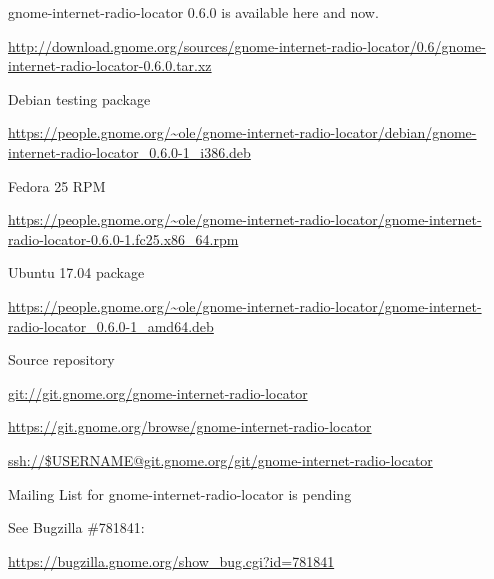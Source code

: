 \documentclass[20pt,landscape]{foils}
\begin{document}
\begin{list1}
\item gnome-internet-radio-locator 0.6.0 is available here and now.
  \begin{list2}
  \item \begin{tiny}\url{http://download.gnome.org/sources/gnome-internet-radio-locator/0.6/gnome-internet-radio-locator-0.6.0.tar.xz}\end{tiny}
  \end{list2}
\item Debian testing package
  \begin{list2}
  \item \begin{tiny}\url{https://people.gnome.org/~ole/gnome-internet-radio-locator/debian/gnome-internet-radio-locator_0.6.0-1_i386.deb}\end{tiny}
  \end{list2}
\item Fedora 25 RPM
  \begin{list2}
  \item \begin{tiny}\url{https://people.gnome.org/~ole/gnome-internet-radio-locator/gnome-internet-radio-locator-0.6.0-1.fc25.x86_64.rpm}\end{tiny}
  \end{list2}
\item Ubuntu 17.04 package
  \begin{list2}
  \item \begin{tiny}\url{https://people.gnome.org/~ole/gnome-internet-radio-locator/gnome-internet-radio-locator_0.6.0-1_amd64.deb}\end{tiny}
  \end{list2}
\item Source repository
  \begin{list2}
    \item \url{git://git.gnome.org/gnome-internet-radio-locator}
    \item \url{https://git.gnome.org/browse/gnome-internet-radio-locator}
    \item \url{ssh://$USERNAME@git.gnome.org/git/gnome-internet-radio-locator}
  \end{list2}
\item Mailing List for gnome-internet-radio-locator is pending\\
  \begin{list2}
  \item See Bugzilla \#781841: \begin{tiny}\url{https://bugzilla.gnome.org/show_bug.cgi?id=781841}\begin{verbatim}


\end{verbatim}
\end{tiny}
\end{list2}
\end{list1}
\end{document}
